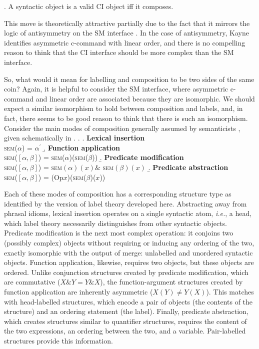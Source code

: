 \documentclass[MilwayThesis]{subfiles}
\begin{document}
\ex. A syntactic object is a valid CI object iff it composes.

This move is theoretically attractive partially due to the fact that it mirrors the logic of antisymmetry on the SM interface \parencite{kayne1994antisymmetry}.
In the case of antisymmetry, Kayne identifies asymmetric c-command with linear order, and there is no compelling reason to think that the CI interface should be more complex than the SM interface.

So, what would it mean for labelling and composition to be two sides of the same coin?
Again, it is helpful to consider the SM interface, where asymmetric c-command and linear order are associated because they are isomorphic.
We should expect a similar isomorphism to hold between composition and labels, and, in fact, there seems to be good reason to think that there is such an isomorphism.
Consider the main modes of composition generally assumed by semanticists \parencite[\textit{e.g.}, by][]{heimkratzer1998semantics}, given schematically in \Next.
\ex. 
\a. \textbf{Lexical insertion}\\
\textsc{sem}($\alpha$) = $\alpha^\prime$
\b. \textbf{Function application}\\
\textsc{sem}($\left[ \alpha, \beta \right]$) = \textsc{sem}($\alpha$)(\textsc{sem}($\beta$))
\b. \textbf{Predicate modification}\\
\textsc{sem}($\left[ \alpha, \beta \right]$) = \textsc{sem}$(\alpha)(x) \&$ \textsc{sem}$(\beta)(x)$
\b. \textbf{Predicate abstraction}\\
\textsc{sem}($\left[ \alpha, \beta \right]$) = (Op$x$)(\textsc{sem}($\beta$)($x$))

Each of these modes of composition has a corresponding structure type as identified by the version of label theory developed here.
Abstracting away from phrasal idioms, lexical insertion operates on a single syntactic atom, \textit{i.e.}, a head, which label theory necessarily distinguishes from other syntactic objects.
Predicate modification is the next most complex operation: it conjoins two (possibly complex) objects without requiring or inducing any ordering of the two, exactly isomorphic with the output of merge: unlabelled and unordered syntactic objects.
Function application, likewise, requires two objects, but these objects are ordered.
Unlike conjunction structures created by predicate modification, which are commutative ($X \& Y = Y \& X$), the function-argument structures created by function application are inherently asymmetric ($X(Y) \neq Y(X)$).
This matches with head-labelled structures, which encode a pair of objects (the contents of the structure) and an ordering statement (the label).
Finally, predicate abstraction, which creates structures similar to quantifier structures, requires the content of the two expressions, an ordering between the two, and a variable.
Pair-labelled structures provide this information.
\end{document}
